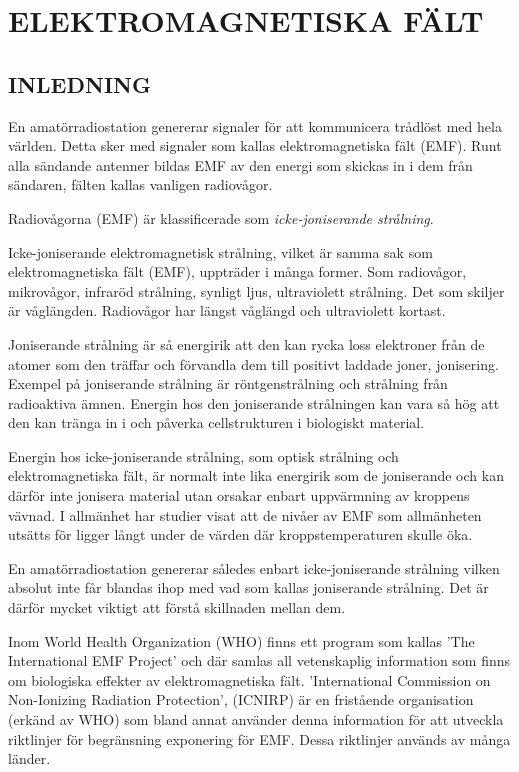 
\chapter{ELEKTROMAGNETISKA FÄLT}

\section{INLEDNING}
En amatörradiostation genererar signaler för att kommunicera trådlöst
med hela världen. Detta sker med signaler som kallas elektromagnetiska
fält (EMF). Runt alla sändande antenner bildas EMF av den energi som
skickas in i dem från sändaren, fälten kallas vanligen radiovågor.

Radiovågorna (EMF) är klassificerade som \emph{icke-joniserande strålning}.

Icke-joniserande elektromagnetisk strålning, vilket är samma sak som
elektromagnetiska fält (EMF), uppträder i många former. Som radiovågor,
mikrovågor, infraröd strålning, synligt ljus, ultraviolett strålning.
Det som skiljer är våglängden. Radiovågor har längst våglängd och
ultraviolett kortast.

Joniserande strålning är så energirik att den kan rycka loss
elektroner från de atomer som den träffar och förvandla dem till
positivt laddade joner, jonisering. Exempel på joniserande
strålning är röntgenstrålning och strålning från radioaktiva ämnen.
Energin hos den joniserande strålningen kan vara så hög att den kan
tränga in i och påverka cellstrukturen i biologiskt material.

Energin hos icke-joniserande strålning, som optisk strålning och
elektromagnetiska fält, är normalt inte lika energirik som de
joniserande och kan därför inte jonisera material utan orsakar enbart
uppvärmning av kroppens vävnad. I allmänhet har studier visat att de
nivåer av EMF som allmänheten utsätts för ligger långt under de värden
där kroppstemperaturen skulle öka.

En amatörradiostation genererar således enbart icke-joniserande
strålning vilken absolut inte får blandas ihop med vad som kallas
joniserande strålning. Det är därför mycket viktigt att förstå
skillnaden mellan dem.

Inom World Health Organization (WHO) finns ett program som kallas
’The International EMF Project’ och där samlas all vetenskaplig
information som finns om biologiska effekter av elektromagnetiska fält.
’International Commission on Non-Ionizing Radiation Protection’, (ICNIRP)
är en fristående organisation (erkänd av WHO) som bland annat använder denna
information för att utveckla riktlinjer för begränsning exponering för EMF.
Dessa riktlinjer används av många länder.

